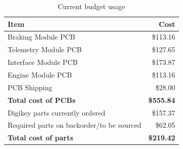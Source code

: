 \documentclass[12pt]{report}
\begin{document}
    \begin{table}[H]
      \begin{centering}
	\caption{Current budget usage}\label{tab:budget}
	\begin{tabular}{|l|r|}
	  \hline 
	  \textbf{Item} & \textbf{Cost}\tabularnewline
	  \hline
	  \hline 
	  Braking Module PCB & \$113.16\tabularnewline
	  \hline 
	  Telemetry Module PCB & \$127.65\tabularnewline
	  \hline 
	  Interface Module PCB & \$173.87\tabularnewline
	  \hline 
	  Engine Module PCB & \$113.16\tabularnewline
	  \hline 
	  PCB Shipping & \$28.00\tabularnewline
	  \hline
	  \hline 
	  \textbf{Total cost of PCBs} & \textbf{\$555.84}\tabularnewline
	  \hline
	  \hline 
	  Digikey parts currently ordered & \$157.37\tabularnewline
	  \hline 
	  Required parts on backorder/to be sourced & \$62.05\tabularnewline
	  \hline
	  \hline 
	  \textbf{Total cost of parts} & \textbf{\$219.42}\tabularnewline
	  \hline
	\end{tabular}
	\par
      \end{centering}
    \end{table}

\pagebreak
\end{document}
